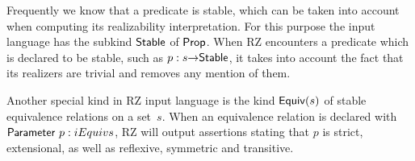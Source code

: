 Frequently we know that a predicate is stable, which can be taken into
account when computing its realizability interpretation. For this
purpose the input language has the subkind $\mathsf{Stable}$ of $\mathsf{Prop}$.
When RZ encounters a predicate which is declared to be stable, such as
$p : s{\to}\mathsf{Stable}$, it takes into account the fact that its
realizers are trivial and removes any mention of them.

Another special kind in RZ input language is the kind $\mathsf{Equiv}(s)$ of
stable equivalence relations on a set~$s$. When an equivalence
relation is declared with $\mathsf{Parameter}\ p : iEquiv{s}$, RZ will output
assertions stating that $p$ is strict, extensional, as well as
reflexive, symmetric and transitive.


